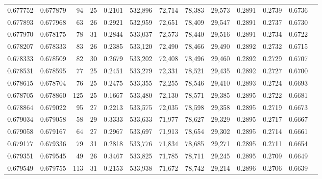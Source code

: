 \begin{tabular}{rrrrrrrrrrrrr}
0.677752 & 0.677879 &     94 &    25 &                                     0.2101 & 532,896 &  72,714 &  78,383 &  29,573 & 0.2891 & 0.2739 & 0.6736 \\
0.677893 & 0.677968 &     63 &    26 &                                     0.2921 & 532,959 &  72,651 &  78,409 &  29,547 & 0.2891 & 0.2737 & 0.6730 \\
0.677970 & 0.678175 &     78 &    31 &                                     0.2844 & 533,037 &  72,573 &  78,440 &  29,516 & 0.2891 & 0.2734 & 0.6722 \\
0.678207 & 0.678333 &     83 &    26 &                                     0.2385 & 533,120 &  72,490 &  78,466 &  29,490 & 0.2892 & 0.2732 & 0.6715 \\
0.678333 & 0.678509 &     82 &    30 &                                     0.2679 & 533,202 &  72,408 &  78,496 &  29,460 & 0.2892 & 0.2729 & 0.6707 \\
0.678531 & 0.678595 &     77 &    25 &                                     0.2451 & 533,279 &  72,331 &  78,521 &  29,435 & 0.2892 & 0.2727 & 0.6700 \\
0.678615 & 0.678704 &     76 &    25 &                                     0.2475 & 533,355 &  72,255 &  78,546 &  29,410 & 0.2893 & 0.2724 & 0.6693 \\
0.678705 & 0.678860 &    125 &    25 &                                     0.1667 & 533,480 &  72,130 &  78,571 &  29,385 & 0.2895 & 0.2722 & 0.6681 \\
0.678864 & 0.679022 &     95 &    27 &                                     0.2213 & 533,575 &  72,035 &  78,598 &  29,358 & 0.2895 & 0.2719 & 0.6673 \\
0.679034 & 0.679058 &     58 &    29 &                                     0.3333 & 533,633 &  71,977 &  78,627 &  29,329 & 0.2895 & 0.2717 & 0.6667 \\
0.679058 & 0.679167 &     64 &    27 &                                     0.2967 & 533,697 &  71,913 &  78,654 &  29,302 & 0.2895 & 0.2714 & 0.6661 \\
0.679177 & 0.679336 &     79 &    31 &                                     0.2818 & 533,776 &  71,834 &  78,685 &  29,271 & 0.2895 & 0.2711 & 0.6654 \\
0.679351 & 0.679545 &     49 &    26 &                                     0.3467 & 533,825 &  71,785 &  78,711 &  29,245 & 0.2895 & 0.2709 & 0.6649 \\
0.679549 & 0.679755 &    113 &    31 &                                     0.2153 & 533,938 &  71,672 &  78,742 &  29,214 & 0.2896 & 0.2706 & 0.6639 \\

\end{tabular}

